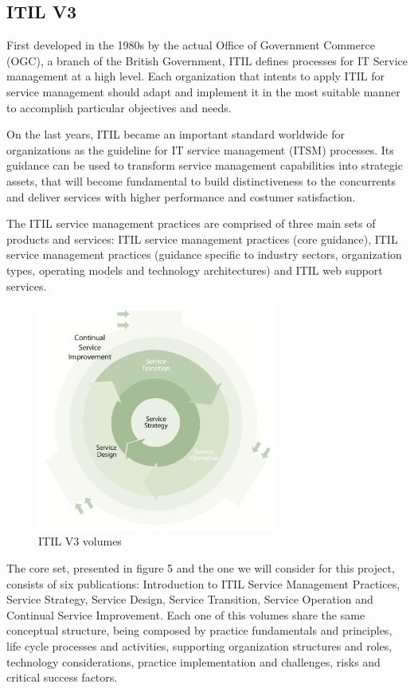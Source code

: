 \subsection{ITIL V3}

First developed in the 1980s by the actual Office of Government Commerce (OGC), a branch of the British Government, ITIL defines processes for IT Service management at a high level. Each organization that intents to apply ITIL for service management should adapt and implement it in the most suitable manner to accomplish  particular objectives and needs.\cite{hill2006combine}\par
On the last years, ITIL became an important standard worldwide for organizations as the guideline for IT service management (ITSM) processes. Its guidance can be used to transform service management capabilities into strategic assets, that will become fundamental to build distinctiveness to the concurrents and deliver services with higher performance and costumer satisfaction.\par
The ITIL service management practices are comprised of three main sets of products and services: ITIL service management practices (core guidance), ITIL service management practices (guidance specific to industry sectors, organization types, operating models and technology architectures) and ITIL web support services.\par

\begin{figure}
\centering
\includegraphics[width=0.7\textwidth]{img/ITILVolumes.png}
\caption{ITIL V3 volumes}
\end{figure}

The core set, presented in figure 5 and the one we will consider for this project, consists of six publications: Introduction to ITIL Service Management Practices, Service Strategy, Service Design, Service Transition, Service Operation and Continual Service Improvement. Each one of this volumes share the same conceptual structure, being composed by practice fundamentals and principles, life cycle processes and activities, supporting organization structures and roles, technology considerations, practice implementation and challenges, risks and critical success factors.

